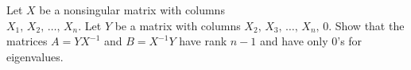 \documentclass{article}
\begin{document}
	\setlength{\parindent}{0pt}
	Let $X$ be a nonsingular matrix with columns\\
	$X_1,\, X_2,\,\dots,\, X_n$. Let $Y$ be a matrix with columns $X_2,\, X_3,\, \dots,\, X_n,\,0$. Show that the matrices $A=YX^{-1}$ and $B=X^{-1}Y$ have rank $n-1$ and have only 0's for eigenvalues.
\end{document}
